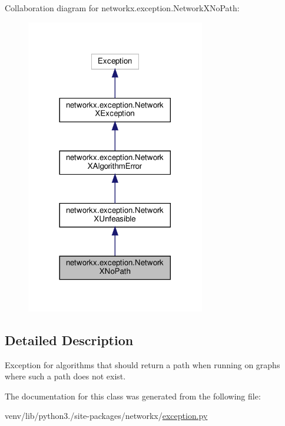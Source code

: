 Collaboration diagram for networkx.\+exception.\+Network\+X\+No\+Path\+:
\nopagebreak
\begin{figure}[H]
\begin{center}
\leavevmode
\includegraphics[width=221pt]{classnetworkx_1_1exception_1_1NetworkXNoPath__coll__graph}
\end{center}
\end{figure}


\subsection{Detailed Description}
\begin{DoxyVerb}Exception for algorithms that should return a path when running
on graphs where such a path does not exist.\end{DoxyVerb}
 

The documentation for this class was generated from the following file\+:\begin{DoxyCompactItemize}
\item 
venv/lib/python3./site-\/packages/networkx/\hyperlink{exception_8py}{exception.\+py}\end{DoxyCompactItemize}
